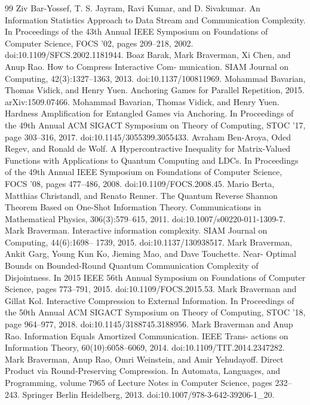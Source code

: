 \begin{thebibliography}{99}
 Ziv Bar-Yossef, T. S. Jayram, Ravi Kumar, and D. Sivakumar. An Information Statistics Approach to Data Stream and Communication Complexity. In Proceedings of the 43th Annual IEEE Symposium on Foundations of Computer Science, FOCS ’02, pages 209–218, 2002. doi:10.1109/SFCS.2002.1181944.
 Boaz Barak, Mark Braverman, Xi Chen, and Anup Rao. How to Compress Interactive Com- munication. SIAM Journal on Computing, 42(3):1327–1363, 2013. doi:10.1137/100811969.
 Mohammad Bavarian, Thomas Vidick, and Henry Yuen. Anchoring Games for Parallel Repetition, 2015. arXiv:1509.07466.
 Mohammad Bavarian, Thomas Vidick, and Henry Yuen. Hardness Amplification for Entangled Games via Anchoring. In Proceedings of the 49th Annual ACM SIGACT Symposium on Theory of Computing, STOC ’17, page 303–316, 2017. doi:10.1145/3055399.3055433.
 Avraham Ben-Aroya, Oded Regev, and Ronald de Wolf. A Hypercontractive Inequality for Matrix-Valued Functions with Applications to Quantum Computing and LDCs. In Proceedings of the 49th Annual IEEE Symposium on Foundations of Computer Science, FOCS ’08, pages 477–486, 2008. doi:10.1109/FOCS.2008.45.
 Mario Berta, Matthias Christandl, and Renato Renner. The Quantum Reverse Shannon Theorem Based on One-Shot Information Theory. Communications in Mathematical Physics, 306(3):579–615, 2011. doi:10.1007/s00220-011-1309-7.
 Mark Braverman. Interactive information complexity. SIAM Journal on Computing, 44(6):1698– 1739, 2015. doi:10.1137/130938517.
 Mark Braverman, Ankit Garg, Young Kun Ko, Jieming Mao, and Dave Touchette. Near- Optimal Bounds on Bounded-Round Quantum Communication Complexity of Disjointness. In 2015 IEEE 56th Annual Symposium on Foundations of Computer Science, pages 773–791, 2015. doi:10.1109/FOCS.2015.53.
 Mark Braverman and Gillat Kol. Interactive Compression to External Information. In Proceedings of the 50th Annual ACM SIGACT Symposium on Theory of Computing, STOC ’18, page 964–977, 2018. doi:10.1145/3188745.3188956.
 Mark Braverman and Anup Rao. Information Equals Amortized Communication. IEEE Trans- actions on Information Theory, 60(10):6058–6069, 2014. doi:10.1109/TIT.2014.2347282.
 Mark Braverman, Anup Rao, Omri Weinstein, and Amir Yehudayoff. Direct Product via Round-Preserving Compression. In Automata, Languages, and Programming, volume 7965 of Lecture Notes in Computer Science, pages 232–243. Springer Berlin Heidelberg, 2013. doi:10.1007/978-3-642-39206-1\_20.

\end{thebibliography}
